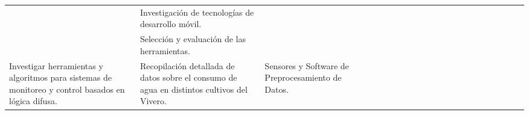 \begin{landscape}
\begin{ThreePartTable}
\begin{longtable}{|p{}|p{5.5cm}|p{5.5cm}|l|l|l|l|l|l|l|l|l|l|l|l|l|l|l|l|l|l|l|}
      \cline{2-2}\cline{4-21}
                                                                                                                                                                                               & Investigación de tecnologías de desarrollo móvil.                                          &                                                                                                                   &                                       & \cellcolor{magenta!70}                &                                       &                                       &                        &                        &                        &                        &                        &                        &                        &                        &                        &                        &                        \\
      \cline{2-2}\cline{4-21}
                                                                                                                                                                                               & Selección y evaluación de las herramientas.                                                &                                                                                                                   &                                       & \cellcolor{magenta!70}                &                                       &                                       &                        &                        &                        &                        &                        &                        &                        &                        &                        &                        &                        \\
      \hline
      \multirow{4}{0.28 \textwidth}{Investigar herramientas y algoritmos para sistemas de monitoreo y control basados en lógica difusa.}                                                       & Recopilación detallada de datos sobre el consumo de agua en distintos cultivos del Vivero. & Sensores y Software de Preprocesamiento de Datos.                                                                 &                                       &                                       & \cellcolor{magenta!70}                &                                       &                        &                        &                        &                        &                        &                        &                        &                        &                        &                        &                        \\

\end{longtable}
\end{ThreePartTable}
\end{landscape}
